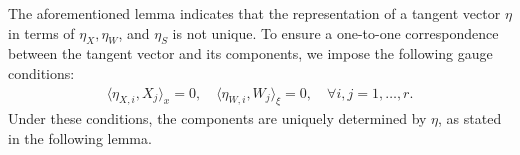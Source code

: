 \documentclass[preprint,11pt]{elsarticle}
\newtheorem{remark}{Remark}[section]
\begin{document}


The aforementioned lemma indicates that the representation of a tangent vector $\eta$ in terms of $\eta_X, \eta_W$, and $\eta_S$ is not unique. To ensure a one-to-one correspondence between the tangent vector and its components, we impose the following gauge conditions:
\begin{align}\label{eq: orthogonal gauge}
    \langle \eta_{X,i}, X_j \rangle_{x} = 0, \quad \langle \eta_{W,i}, W_j \rangle_{\xi} = 0, \quad \forall i, j = 1, \dots, r.
\end{align}
Under these conditions, the components are uniquely determined by $\eta$, as stated in the following lemma.
\end{document}
